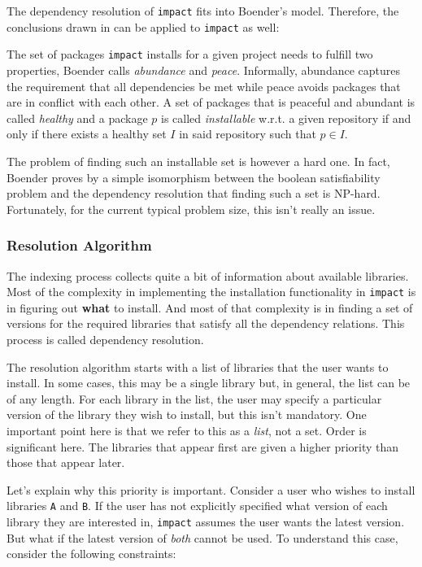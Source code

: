 \documentclass[11pt,a4paper,twocolumn]{article}
\newcommand{\code}[1]{\texttt{#1}} %
\begin{document}
The dependency resolution of \code{impact} fits into Boender's model.
Therefore, the conclusions drawn in \parencite{boender2011formal} can be
applied to \code{impact} as well:

The set of packages \code{impact} installs for a given project needs to
fulfill two properties, Boender calls \emph{abundance} and \emph{peace}.
Informally, abundance captures the requirement that all dependencies
be met while peace avoids packages that are in conflict with each
other.  A set of packages that is peaceful and abundant is called {\em
  healthy} and a package $p$ is called \emph{installable} w.r.t. a
given repository if and only if there exists a healthy set $I$ in said
repository such that $p \in I$.

The problem of finding such an installable set is however a hard one.
In fact, Boender proves by a simple isomorphism between the boolean
satisfiability problem and the dependency resolution that finding such
a set is NP-hard.  Fortunately, for the current typical problem size,
this isn't really an issue.

\subsubsection{Resolution Algorithm}
\label{sec:algorithm}

The indexing process collects quite a bit of information about
available libraries.  Most of the complexity in implementing the
installation functionality in \code{impact} is in figuring out
\textbf{what} to install.  And most of that complexity is in finding a set
of versions for the required libraries that satisfy all the dependency
relations.  This process is called dependency resolution.

The resolution algorithm starts with a list of libraries that the user
wants to install.  In some cases, this may be a single library but, in
general, the list can be of any length.  For each library in the list,
the user may specify a particular version of the library they wish to
install, but this isn't mandatory.  One important point here is that
we refer to this as a \emph{list}, not a set.  Order is significant
here.  The libraries that appear first are given a higher priority
than those that appear later.

Let's explain why this priority is important.  Consider a user who
wishes to install libraries \code{A} and \code{B}.  If the user has
not explicitly specified what version of each library they are
interested in, \code{impact} assumes the user wants the latest
version.  But what if the latest version of \emph{both} cannot be
used.  To understand this case, consider the following constraints:
\end{document}
